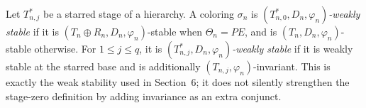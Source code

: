 \begin{definition}
Let $T_{n,j}^{*}$ be a starred stage of a hierarchy.  A coloring
$\sigma_n$ is \emph{$(T_{n,0}^{*},D_n,\varphi_n)$-weakly stable} if it
is $(T_n\oplus R_n,D_n,\varphi_n)$-stable when $\Theta_n=PE$, and is
$(T_n,D_n,\varphi_n)$-stable otherwise.  For $1\leq j\leq q$, it is
\emph{$(T_{n,j}^{*},D_n,\varphi_n)$-weakly stable} if it is weakly
stable at the starred base and is additionally
$(T_{n,j},\varphi_n)$-invariant.  This is exactly the weak stability used
in Section~6; it does not silently strengthen the stage-zero definition
by adding invariance as an extra conjunct.
\end{definition}
